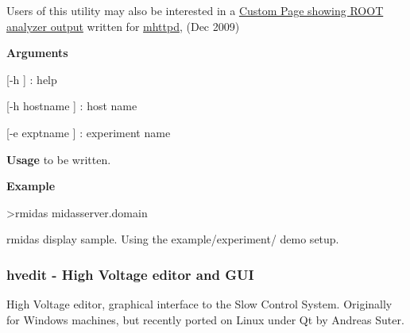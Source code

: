  Users of this utility may also be interested in a \hyperlink{RC_ROOT_analyzer_page}{Custom Page showing ROOT analyzer output} written for \hyperlink{RC_mhttpd}{mhttpd}, (Dec 2009) 


\begin{DoxyItemize}
\item {\bfseries  Arguments }
\begin{DoxyItemize}
\item \mbox{[}-\/h \mbox{]} : help
\item \mbox{[}-\/h hostname \mbox{]} : host name
\item \mbox{[}-\/e exptname \mbox{]} : experiment name
\end{DoxyItemize}
\item {\bfseries  Usage } to be written.
\item {\bfseries  Example } 
\begin{DoxyCode}
 >rmidas midasserver.domain
\end{DoxyCode}

\end{DoxyItemize}

\begin{center} rmidas display sample. Using the example/experiment/ demo setup.  \end{center} 



\hypertarget{RC_Monitor_RC_hvedit_utility}{}\subsubsection{hvedit       -\/ High Voltage editor and GUI}\label{RC_Monitor_RC_hvedit_utility}
\label{RC_Monitor_idx_hvedit-utility}
\hypertarget{RC_Monitor_idx_hvedit-utility}{}
 High Voltage editor, graphical interface to the Slow Control System. Originally for Windows machines, but recently ported on Linux under Qt by Andreas Suter.


